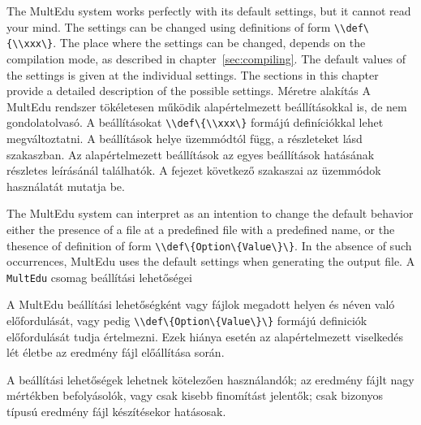 





{
The \gls{MultEdu} system works perfectly with its default settings, but it cannot read your mind.
The settings can be changed using definitions of form \lstinline|\\def\{\\xxx\}|.
The place where the settings can be changed, depends on the compilation mode,
as described in chapter~\ref{sec:compiling}. The default values of the settings
is given at the individual settings.
The sections in this chapter provide a detailed description of the possible settings.
}
{Méretre alakítás}
{
A \gls{MultEdu} rendszer tökéletesen működik alapértelmezett beállításokkal is,
de nem gondolatolvasó. A beállításokat \lstinline|\\def\{\\xxx\}| formájú definíciókkal
lehet megváltoztatni. A beállítások helye üzemmódtól függ,
a részleteket lásd ~ szakaszban. 
Az alapértelmezett beállítások az egyes beállítások hatásának részletes 
leírásánál találhatók.
A fejezet következő szakaszai 
az üzemmódok használatát mutatja be.
}



{
The \gls{MultEdu} system can interpret as an intention to change the default
behavior either the presence of a file at a predefined file with a predefined name,
or the thesence of definition of form \lstinline|\\def\{Option\{Value\}\}|.
In the absence of such occurrences, \gls{MultEdu} uses the default settings 
when generating the output file.
}
{A \lstinline|MultEdu| csomag beállítási lehetőségei}
{
A \gls{MultEdu} beállítási lehetőségként vagy fájlok megadott helyen és néven 
való előfordulását, vagy pedig \lstinline|\\def\{Option\{Value\}\}| formájú definiciók előfordulását tudja értelmezni. Ezek hiánya esetén az alapértelmezett
viselkedés lét életbe az eredmény fájl előállítása során. 

A beállítási lehetőségek lehetnek kötelezően használandók;
az eredmény fájlt nagy mértékben befolyásolók, vagy csak kisebb
finomítást jelentők;
csak bizonyos típusú eredmény fájl készítésekor hatásosak.
}


